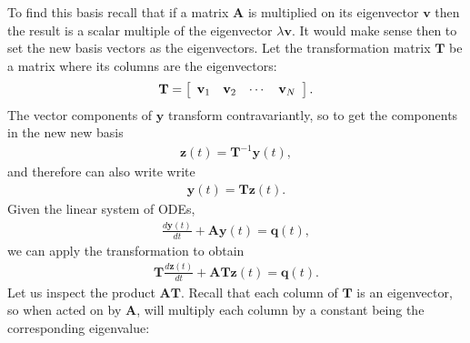 
To find this basis recall that if a matrix $\mathbf{A}$ is multiplied on its eigenvector $\mathbf{v}$ then the result is a scalar multiple of the eigenvector $\lambda \mathbf{v}$. It would make sense then to set the new basis vectors as the eigenvectors. Let the transformation matrix $\mathbf{T}$ be a matrix where its columns are the eigenvectors:
\begin{align}
  \mathbf{T} = \left[ \begin{array}{c c c c} \mathbf{v}_1 & \mathbf{v}_2 & \cdots & \mathbf{v}_N \end{array} \right] .
\end{align}
The vector components of $\mathbf{y}$ transform contravariantly, so to get the components in the new new basis
\begin{align}
  \mathbf{z}(t) = \mathbf{T}^{-1} \mathbf{y}(t),
\end{align}
and therefore can also write write
\begin{align}
  \mathbf{y}(t) = \mathbf{T} \mathbf{z}(t).
\end{align}
Given the linear system of ODEs,
\begin{align}
  \frac{d \mathbf{y}(t)}{dt}  + \mathbf{A} \mathbf{y}(t) = \mathbf{q}(t), \nonumber
\end{align}
we can apply the transformation to obtain
\begin{align}
  \mathbf{T} \frac{d \mathbf{z}(t)}{dt} + \mathbf{A} \mathbf{T} \mathbf{z}(t) = \mathbf{q}(t).
\end{align}
Let us inspect the product $\mathbf{AT}$. Recall that each column of $\mathbf{T}$ is an eigenvector, so when acted on by $\mathbf{A}$, will multiply each column by a constant being the corresponding eigenvalue:
